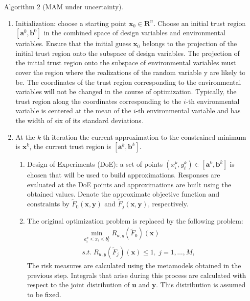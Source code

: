 \documentclass{llncs}
\begin{document}
Algorithm 2 (MAM under uncertainty).
\begin{enumerate}
  \item Initialization: choose a starting point $\boldsymbol x_0 \in {\boldsymbol R}^n$. 
	Choose an initial trust region $[\boldsymbol a^0,\boldsymbol b^0]$ in the combined space of design variables and environmental variables. 
	Ensure that the initial guess $\boldsymbol x_0$ belongs to the projection of the initial trust region onto the subspace of design variables. The projection of the initial trust region onto the subspace of environmental variables must cover the region where the realizations of the random variable y are likely to be. The coordinates of the trust region corresponding to the environmental variables will not be changed in the course of optimization. Typically, the trust region along the coordinates corresponding to the $i$-th environmental variable is centered at the mean of the $i$-th environmental variable and has the width of six of its standard deviations.
  \item At the $k$-th iteration the current approximation to the constrained minimum is $\boldsymbol x^k$, the current trust region is $[\boldsymbol a^k,\boldsymbol b^k]$.
  \begin{enumerate}[label=(\alph*)]
    \item Design of Experiments (DoE): a set of points $(x_i^k,y_i^k)\in [\boldsymbol a^k,\boldsymbol b^k]$ is chosen that will be used to build approximations. Responses are evaluated at the DoE points and approximations are built using the obtained values.
    Denote the approximate objective function and constraints by $\widetilde{F}_0(\boldsymbol x, \boldsymbol y)$ and $\widetilde{F}_j(\boldsymbol x, \boldsymbol y)$, respectively.
    \item The original optimization problem is replaced by the following problem:
    \begin{equation}
      \label{eq:problem_u_tilde}
      \begin{array}{c}
      \min\limits_{a_i^k \le x_i \le b_i^k}R_{u,y}(\widetilde{F}_0)(\boldsymbol x) \\
      s.t.\; R_{u,y}(\widetilde{F}_j)(\boldsymbol x) \le 1,\; j=1,\dots ,M,
      \end{array}
    \end{equation}
    The risk measures are calculated using the metamodels obtained in the previous step. Integrals that arise during this process are calculated with respect to the joint distribution of $\boldsymbol u$ and $\boldsymbol y$. This distribution is assumed to be fixed.

\end{enumerate}
\end{enumerate}
\end{document}
